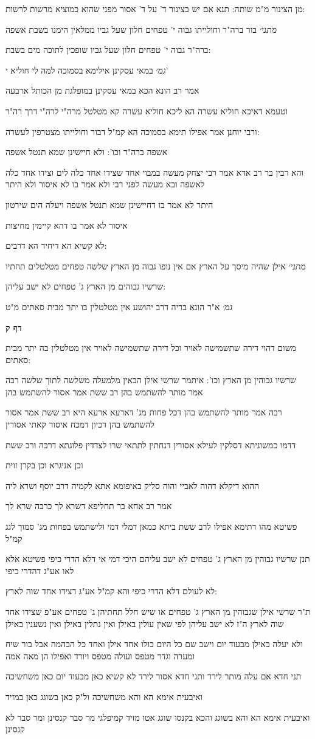 \documentclass[12pt, openany]{book}
\newcommand{\sethebfont}{
\fontsize{10.5pt}{21.0pt} \selectfont
}
\newcommand{\textblock}[1]{
{\sethebfont #1\\}	
}
\newcommand{\sectname}{}
\newcommand{\newsection}[1]{
	\addcontentsline{toc}{section}{#1}
	\renewcommand{\sectname}{#1}	
	\vspace{-\baselineskip}
	\begin{center}
		\textbf{%
\fontsize{16pt}{16pt}\selectfont
			#1}
	\end{center}
	\vspace{-\baselineskip}
	\nopagebreak
}
\begin{document}
\textblock{מן הצינור מ"מ שותה: תנא אם יש בצינור ד' על ד' אסור מפני שהוא כמוציא מרשות לרשות:}
\textblock{{\large\emph{מתני׳}} בור ברה"ר וחולייתו גבוה י' טפחים חלון שעל גביו ממלאין הימנו בשבת אשפה}
\textblock{ברה"ר גבוה י' טפחים חלון שעל גביו שופכין לתוכה מים בשבת:}
\textblock{{\large\emph{גמ׳}} במאי עסקינן אילימא בסמוכה למה לי חוליא י'}
\textblock{אמר רב הונא הכא במאי עסקינן במופלגת מן הכותל ארבעה}
\textblock{וטעמא דאיכא חוליא עשרה הא ליכא חוליא עשרה קא מטלטל מרה"י לרה"י דרך רה"ר}
\textblock{ורבי יוחנן אמר אפילו תימא בסמוכה הא קמ"ל דבור וחולייתו מצטרפין לעשרה:}
\textblock{אשפה ברה"ר וכו': ולא חיישינן שמא תנטל אשפה}
\textblock{והא רבין בר רב אדא אמר רבי יצחק מעשה במבוי אחד שצידו אחד כלה לים וצידו אחד כלה לאשפה ובא מעשה לפני רבי ולא אמר בו לא איסור ולא היתר}
\textblock{היתר לא אמר בו דחיישינן שמא תנטל אשפה ויעלה הים שירטון}
\textblock{איסור לא אמר בו דהא קיימין מחיצות}
\textblock{לא קשיא הא דיחיד הא דרבים:}
\textblock{{\large\emph{מתני׳}} אילן שהיה מיסך על הארץ אם אין נופו גבוה מן הארץ שלשה טפחים מטלטלים תחתיו}
\textblock{שרשיו גבוהים מן הארץ ג' טפחים לא ישב עליהן:}
\textblock{{\large\emph{גמ׳}} א"ר הונא בריה דרב יהושע אין מטלטלין בו יתר מבית סאתים מ"ט}
\newsection{דף ק}
\textblock{משום דהוי דירה שתשמישה לאויר וכל דירה שתשמישה לאויר אין מטלטלין בה יתר מבית סאתים:}
\textblock{שרשיו גבוהין מן הארץ וכו': איתמר שרשי אילן הבאין מלמעלה משלשה לתוך שלשה רבה אמר מותר להשתמש בהן רב ששת אמר אסור להשתמש בהן}
\textblock{רבה אמר מותר להשתמש בהן דכל פחות מג' דארעא ארעא היא רב ששת אמר אסור להשתמש בהן דכיון דמכח איסור קאתי אסורין}
\textblock{דדמו כמשוניתא דסלקין לעילא אסורין דנחתין לתתאי שרו לצדדין פלוגתא דרבה ורב ששת}
\textblock{וכן אניגרא וכן בקרן זוית}
\textblock{ההוא דיקלא דהוה לאביי והוה סליק באיפומא אתא לקמיה דרב יוסף ושרא ליה}
\textblock{אמר רב אחא בר תחליפא דשרא לך כרבה שרא לך}
\textblock{פשיטא מהו דתימא אפילו לרב ששת ביתא כמאן דמלי דמי ולישתמש בפחות מג' סמוך לגג קמ"ל}
\textblock{תנן שרשיו גבוהין מן הארץ ג' טפחים לא ישב עליהם היכי דמי אי דלא הדרי כיפי פשיטא אלא לאו אע"ג דהדרי כיפי}
\textblock{לא לעולם דלא הדרי כיפי והא קמ"ל אע"ג דצידו אחד שוה לארץ:}
\textblock{ת"ר שרשי אילן שגבוהין מן הארץ ג' טפחים או שיש חלל תחתיהן ג' טפחים אע"פ שצידו אחד שוה לארץ ה"ז לא ישב עליהן לפי שאין עולין באילן ואין נתלין באילן ואין נשענין באילן}
\textblock{ולא יעלה באילן מבעוד יום וישב שם כל היום כולו אחד אילן ואחד כל הבהמה אבל בור שיח ומערה וגדר מטפס ועולה מטפס ויורד ואפילו הן מאה אמה}
\textblock{תני חדא אם עלה מותר לירד ותני חדא אסור לירד לא קשיא כאן מבעוד יום כאן משחשיכה}
\textblock{ואיבעית אימא הא והא משחשיכה ול"ק כאן בשוגג כאן במזיד}
\textblock{ואיבעית אימא הא והא בשוגג והכא בקנסו שוגג אטו מזיד קמיפלגי מר סבר קנסינן ומר סבר לא קנסינן}
\end{document}
